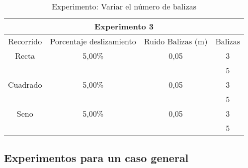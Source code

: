 \begin{table}[htbp]
\caption{Experimento: Variar el número de balizas}
\begin{center}
\begin{tabular}{|c|l|l|l|c|}
\hline
\multicolumn{ 5}{|c|}{Experimento 3} \\ \hline
Recorrido & \multicolumn{1}{c|}{Porcentaje deslizamiento} & \multicolumn{ 2}{c|}{Ruido Balizas (m)} & Balizas \\ \hline
\multicolumn{ 1}{|c|}{Recta} & \multicolumn{ 1}{c|}{5,00\%} & \multicolumn{ 2}{c|}{0,05} & 3 \\ \cline{ 5- 5}
\multicolumn{ 1}{|l|}{} & \multicolumn{ 1}{l|}{} & \multicolumn{ 2}{l|}{} & 5 \\ \hline
\multicolumn{ 1}{|c|}{Cuadrado} & \multicolumn{ 1}{c|}{5,00\%} & \multicolumn{ 2}{c|}{0,05} & 3 \\ \cline{ 5- 5}
\multicolumn{ 1}{|l|}{} & \multicolumn{ 1}{l|}{} & \multicolumn{ 2}{l|}{} & 5 \\ \hline
\multicolumn{ 1}{|c|}{Seno} & \multicolumn{ 1}{c|}{5,00\%} & \multicolumn{ 2}{c|}{0,05} & 3 \\ \cline{ 5- 5}
\multicolumn{ 1}{|l|}{} & \multicolumn{ 1}{l|}{} & \multicolumn{ 2}{l|}{} & 5 \\ \hline
\end{tabular}
\end{center}
\label{tabla:exp_variarBal}
\end{table}



\subsection{Experimentos para un caso general}
%
%
%


